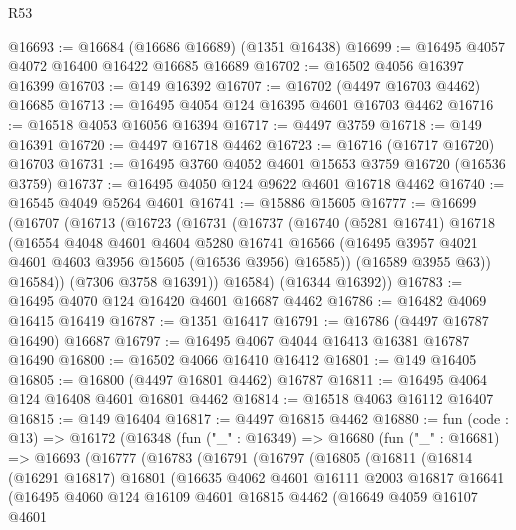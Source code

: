 \begin{lexlean}{R53}
\begin{coremodule}
@16693 := @16684 (@16686 @16689) (@1351 @16438)
@16699 := @16495 @4057 @4072 @16400 @16422 @16685 @16689
@16702 := @16502 @4056 @16397 @16399
@16703 := @149 @16392
@16707 := @16702 (@4497 @16703 @4462) @16685
@16713 := @16495 @4054 @124 @16395 @4601 @16703 @4462
@16716 := @16518 @4053 @16056 @16394
@16717 := @4497 @3759
@16718 := @149 @16391
@16720 := @4497 @16718 @4462
@16723 := @16716 (@16717 @16720) @16703
@16731 := @16495 @3760 @4052 @4601 @15653 @3759 @16720 (@16536 @3759)
@16737 := @16495 @4050 @124 @9622 @4601 @16718 @4462
@16740 := @16545 @4049 @5264 @4601
@16741 := @15886 @15605
@16777 := @16699
    (@16707
      (@16713
        (@16723
          (@16731
            (@16737
              (@16740
                (@5281 @16741)
                @16718
                (@16554
                  @4048
                  @4601
                  @4604
                  @5280
                  @16741
                  @16566
                  (@16495 @3957 @4021 @4601 @4603 @3956 @15605 (@16536 @3956) @16585))
                (@16589 @3955 @63))
              @16584))
          (@7306 @3758 @16391))
        @16584)
      (@16344 @16392))
@16783 := @16495 @4070 @124 @16420 @4601 @16687 @4462
@16786 := @16482 @4069 @16415 @16419
@16787 := @1351 @16417
@16791 := @16786 (@4497 @16787 @16490) @16687
@16797 := @16495 @4067 @4044 @16413 @16381 @16787 @16490
@16800 := @16502 @4066 @16410 @16412
@16801 := @149 @16405
@16805 := @16800 (@4497 @16801 @4462) @16787
@16811 := @16495 @4064 @124 @16408 @4601 @16801 @4462
@16814 := @16518 @4063 @16112 @16407
@16815 := @149 @16404
@16817 := @4497 @16815 @4462
@16880 := fun (code : @13) =>
  @16172
    (@16348
      (fun ("_" : @16349) =>
      @16680
        (fun ("_" : @16681) =>
        @16693
          (@16777
            (@16783
              (@16791
                (@16797
                  (@16805
                    (@16811
                      (@16814
                        (@16291 @16817)
                        @16801
                        (@16635
                          @4062
                          @4601
                          @16111
                          @2003
                          @16817
                          @16641
                          (@16495
                            @4060
                            @124
                            @16109
                            @4601
                            @16815
                            @4462
                            (@16649
                              @4059
                              @16107
                              @4601

\end{coremodule}
\end{lexlean}
